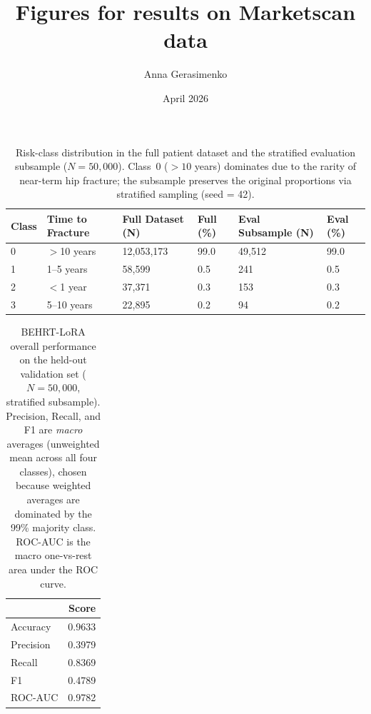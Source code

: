 \documentclass{article}
\title{Figures for results on Marketscan data}
\author{Anna Gerasimenko}
\date{April 2026}
\begin{document}
\maketitle

\begin{table}[h]
\caption{Risk-class distribution in the full patient dataset and the stratified evaluation subsample ($N=50{,}000$). Class~0 ($>10$ years) dominates due to the rarity of near-term hip fracture; the subsample preserves the original proportions via stratified sampling (seed = 42).}
\label{tab:class_distribution}
\begin{tabular}{llllll}
\toprule
Class & Time to Fracture & Full Dataset (N) & Full (\%) & Eval Subsample (N) & Eval (\%) \\
\midrule
0 & $>$10 years & 12{,}053{,}173 & 99.0 & 49{,}512 & 99.0 \\
1 & 1--5 years  & 58{,}599       & 0.5  & 241      & 0.5  \\
2 & $<$1 year   & 37{,}371       & 0.3  & 153      & 0.3  \\
3 & 5--10 years & 22{,}895       & 0.2  & 94       & 0.2  \\
\bottomrule
\end{tabular}
\end{table}

\begin{table}
\caption{BEHRT-LoRA overall performance on the held-out validation set ($N=50{,}000$, stratified subsample). Precision, Recall, and F1 are \textit{macro} averages (unweighted mean across all four classes), chosen because weighted averages are dominated by the 99\% majority class. ROC-AUC is the macro one-vs-rest area under the ROC curve.}
\label{tab:overall_metrics}
\begin{tabular}{lr}
\toprule
 & Score \\
\midrule
Accuracy & 0.9633 \\
Precision & 0.3979 \\
Recall & 0.8369 \\
F1 & 0.4789 \\
ROC-AUC & 0.9782 \\
\bottomrule
\end{tabular}
\end{table}
\end{document}
